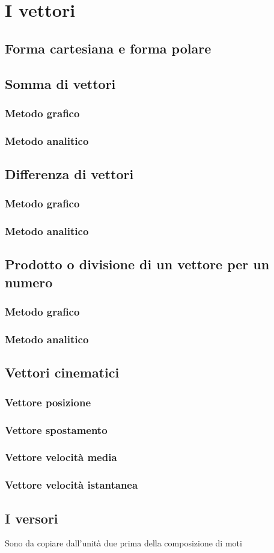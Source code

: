 \section{I vettori}
\subsection{Forma cartesiana e forma polare}
\subsection{Somma di vettori}
\subsubsection{Metodo grafico}
\subsubsection{Metodo analitico}
\subsection{Differenza di vettori}
\subsubsection{Metodo grafico}
\subsubsection{Metodo analitico}
\subsection{Prodotto o divisione di un vettore per un numero}
\subsubsection{Metodo grafico}
\subsubsection{Metodo analitico}
\subsection{Vettori cinematici}
\subsubsection{Vettore posizione}
\subsubsection{Vettore spostamento}
\subsubsection{Vettore velocità media}
\subsubsection{Vettore velocità istantanea}
\subsection{I versori}
\par Sono da copiare dall'unità due prima della composizione di moti